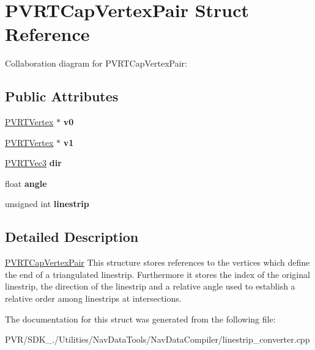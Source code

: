 \hypertarget{struct_p_v_r_t_cap_vertex_pair}{\section{P\+V\+R\+T\+Cap\+Vertex\+Pair Struct Reference}
\label{struct_p_v_r_t_cap_vertex_pair}
}


Collaboration diagram for P\+V\+R\+T\+Cap\+Vertex\+Pair\+:
\subsection*{Public Attributes}
\begin{DoxyCompactItemize}
\item 
\hypertarget{struct_p_v_r_t_cap_vertex_pair_a5a024eb860170693a3a9cd2eb9b50e8f}{\hyperlink{structpvrnavigation_1_1_p_v_r_t_vertex}{P\+V\+R\+T\+Vertex} $\ast$ {\bfseries v0}}\label{struct_p_v_r_t_cap_vertex_pair_a5a024eb860170693a3a9cd2eb9b50e8f}

\item 
\hypertarget{struct_p_v_r_t_cap_vertex_pair_a34edd634166e8b5dda4b3412f9cc3eb1}{\hyperlink{structpvrnavigation_1_1_p_v_r_t_vertex}{P\+V\+R\+T\+Vertex} $\ast$ {\bfseries v1}}\label{struct_p_v_r_t_cap_vertex_pair_a34edd634166e8b5dda4b3412f9cc3eb1}

\item 
\hypertarget{struct_p_v_r_t_cap_vertex_pair_a0e601e686944d21d61e610221d92a2b5}{\hyperlink{struct_p_v_r_t_vec3}{P\+V\+R\+T\+Vec3} {\bfseries dir}}\label{struct_p_v_r_t_cap_vertex_pair_a0e601e686944d21d61e610221d92a2b5}

\item 
\hypertarget{struct_p_v_r_t_cap_vertex_pair_a7122d2005c7915cf799757b31e35568c}{float {\bfseries angle}}\label{struct_p_v_r_t_cap_vertex_pair_a7122d2005c7915cf799757b31e35568c}

\item 
\hypertarget{struct_p_v_r_t_cap_vertex_pair_aa16d2e47932562dde16e9e01d90ab8f4}{unsigned int {\bfseries linestrip}}\label{struct_p_v_r_t_cap_vertex_pair_aa16d2e47932562dde16e9e01d90ab8f4}

\end{DoxyCompactItemize}


\subsection{Detailed Description}


  \hyperlink{struct_p_v_r_t_cap_vertex_pair}{P\+V\+R\+T\+Cap\+Vertex\+Pair}  This structure stores references to the vertices which define the end of a triangulated linestrip. Furthermore it stores the index of the original linestrip, the direction of the linestrip and a relative angle used to establish a relative order among linestrips at intersections. 

The documentation for this struct was generated from the following file\+:\begin{DoxyCompactItemize}
\item 
P\+V\+R/\+S\+D\+K\+\_./\+Utilities/\+Nav\+Data\+Tools/\+Nav\+Data\+Compiler/linestrip\+\_\+converter.\+cpp\end{DoxyCompactItemize}
